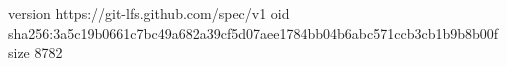 version https://git-lfs.github.com/spec/v1
oid sha256:3a5c19b0661c7bc49a682a39cf5d07aee1784bb04b6abc571ccb3cb1b9b8b00f
size 8782

